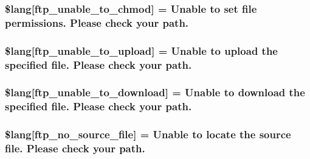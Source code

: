 \subsubsection[{\$lang}]{\setlength{\rightskip}{0pt plus 5cm}\$lang\mbox{[}\textquotesingle{}ftp\+\_\+unable\+\_\+to\+\_\+chmod\textquotesingle{}\mbox{]} = \textquotesingle{}Unable to set file permissions. Please check your path.\textquotesingle{}}\label{system_2language_2english_2ftp__lang_8php_a9ffd10144a0dfd5a3c7ab69e4edf1fdf}
\hypertarget{system_2language_2english_2ftp__lang_8php_a1fd0c9f4e0f3be691a809ce804900ed7}{}
\subsubsection[{\$lang}]{\setlength{\rightskip}{0pt plus 5cm}\$lang\mbox{[}\textquotesingle{}ftp\+\_\+unable\+\_\+to\+\_\+upload\textquotesingle{}\mbox{]} = \textquotesingle{}Unable to upload the specified file. Please check your path.\textquotesingle{}}\label{system_2language_2english_2ftp__lang_8php_a1fd0c9f4e0f3be691a809ce804900ed7}
\hypertarget{system_2language_2english_2ftp__lang_8php_a65fa9f8b6a3da91390b36721c2a9775b}{}
\subsubsection[{\$lang}]{\setlength{\rightskip}{0pt plus 5cm}\$lang\mbox{[}\textquotesingle{}ftp\+\_\+unable\+\_\+to\+\_\+download\textquotesingle{}\mbox{]} = \textquotesingle{}Unable to download the specified file. Please check your path.\textquotesingle{}}\label{system_2language_2english_2ftp__lang_8php_a65fa9f8b6a3da91390b36721c2a9775b}
\hypertarget{system_2language_2english_2ftp__lang_8php_abf3e74ee1af13c9b0f0cc63fbb9081f1}{}
\subsubsection[{\$lang}]{\setlength{\rightskip}{0pt plus 5cm}\$lang\mbox{[}\textquotesingle{}ftp\+\_\+no\+\_\+source\+\_\+file\textquotesingle{}\mbox{]} = \textquotesingle{}Unable to locate the source file. Please check your path.\textquotesingle{}}\label{system_2language_2english_2ftp__lang_8php_abf3e74ee1af13c9b0f0cc63fbb9081f1}
\hypertarget{system_2language_2english_2ftp__lang_8php_ae2715b036a8015f4da2841c15ab8db79}{}
